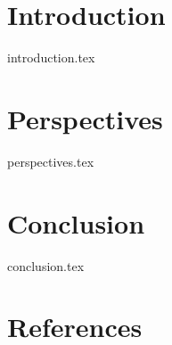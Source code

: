 \documentclass[a4paper]{article}
\title{\thetitle}
\author{\theauthor}
\date{\thedate}
\begin{document}

\thispagestyle{empty}
\maketitle
\begin{abstract}
    {abstract.tex}
\end{abstract}


\clearpage\newpage
{}
\renewcommand{\contentsname}{Table of Contents}
\tableofcontents
\listoffigures
\listoftables
\clearpage\newpage
\printglossary[type=\acronymtype]
\clearpage\newpage


\setcounter{page}{1}

\section{Introduction}
{introduction.tex}

\section{Perspectives}
{perspectives.tex}

\section{Conclusion}
{conclusion.tex}

\section{References}
\printbibliography
\end{document}
